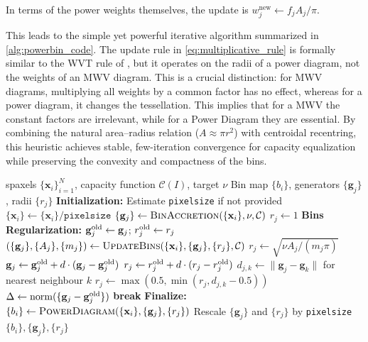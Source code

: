 \documentclass[fleqn,usenatbib]{mnras}
\newcommand{\norm}[1]{\lVert#1\rVert}
\begin{document}
In terms of the power weights themselves, the update is $w_j^{\text{new}} \leftarrow f_j A_j / \pi$.

This leads to the simple yet powerful iterative algorithm summarized in \autoref{alg:powerbin_code}. The update rule in \autoref{eq:multiplicative_rule} is formally similar to the WVT rule of \citet{Diehl2006}, but it operates on the radii of a power diagram, not the weights of an MWV diagram. This is a crucial distinction: for MWV diagrams, multiplying all weights by a common factor has no effect, whereas for a power diagram, it changes the tessellation. This implies that for a MWV the constant factors are irrelevant, while for a Power Diagram they are essential. By combining the natural area–radius relation ($A\approx \pi r^2$) with centroidal recentring, this heuristic achieves stable, few-iteration convergence for capacity equalization while preserving the convexity and compactness of the bins.

\begin{algorithm}[t]
\caption{PowerBin}
\label{alg:powerbin_code}
\begin{algorithmic}
\Require spaxels $\{\mathbf{x}_i\}_{i=1}^N$, capacity function $\mathcal{C}(I)$, target $\nu$
\Ensure Bin map $\{b_i\}$, generators $\{\mathbf{g}_j\}$, radii $\{r_j\}$
\Statex
\State \textbf{Initialization:}
\State Estimate \texttt{pixelsize} if not provided
\State $\{\mathbf{x}_i\} \gets \{\mathbf{x}_i\} / \texttt{pixelsize}$ 
\State $\{\mathbf{g}_j\} \gets \textsc{BinAccretion}(\{\mathbf{x}_i\}, \nu, \mathcal{C})$ 
\State $r_j \gets 1$ 
\Statex
\State \textbf{Bins Regularization:}
  \State $\mathbf{g}^{\rm old}_j \gets \mathbf{g}_j$; \quad $r^{\rm old}_j \gets r_j$ 
  \State $(\{\mathbf{g}_j\},\{A_j\},\{m_j\}) \gets\textsc{UpdateBins}(\{\mathbf{x}_i\},\{\mathbf{g}_j\},\{r_j\},\mathcal{C})$
  \State $r_j \gets \sqrt{\nu A_j/(m_j \pi)}$ 
    \State $\mathbf{g}_j \gets \mathbf{g}^{\rm old}_j + d \cdot (\mathbf{g}_j - \mathbf{g}^{\rm old}_j)$ 
    \State $r_j \gets r^{\rm old}_j + d \cdot (r_j - r^{\rm old}_j)$ 
  \EndIf
  \State $d_{j,k} \gets \norm{\mathbf{g}_j - \mathbf{g}_k}$ for nearest neighbour $k$ 
  \State $r_j \gets \max(0.5, \min(r_j, d_{j,k} - 0.5))$ 
  \State $\Delta\gets \mathrm{norm}(\{\mathbf{g}_j-\mathbf{g}^{\rm old}_j\})$
   \State \textbf{break} \EndIf
\EndFor
\Statex
\State \textbf{Finalize:}
\State $\{b_i\} \gets \textsc{PowerDiagram}(\{\mathbf{x}_i\},\{\mathbf{g}_j\},\{r_j\})$
\State Rescale $\{\mathbf{g}_j\}$ and $\{r_j\}$ by \texttt{pixelsize}
\State \Return $\{b_i\}, \{\mathbf{g}_j\}, \{r_j\}$
\end{algorithmic}
\end{algorithm}
\end{document}

